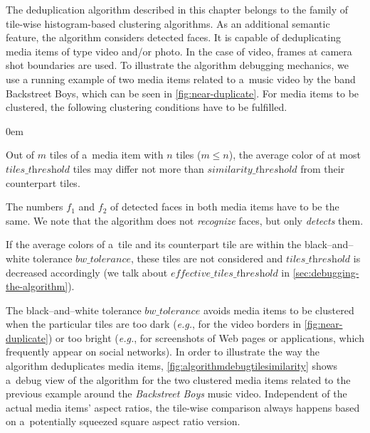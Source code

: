 The deduplication algorithm described in this chapter
belongs to the family of tile-wise histogram-based clustering algorithms.
As an additional semantic feature, the algorithm considers detected faces.
It is capable of deduplicating media items of type video and/or photo.
In the case of video, frames at camera shot boundaries are used.
To illustrate the algorithm debugging mechanics,
we use a running example of two media items related to a~music video by the 
band Backstreet Boys, which can be seen in \autoref{fig:near-duplicate}.
For media items to be clustered,
the following clustering conditions have to be fulfilled.

\begin{description}
  \itemsep0em
  \item[Cond.~1] Out of $m$ tiles of a~media item with $n$ tiles ($m \leq n$),
    the average color of at most $\textit{tiles\_threshold}$ tiles
    may differ not more than $\textit{similarity\_threshold}$
    from their counterpart tiles.
  \item[Cond.~2] The numbers $f_1$ and $f_2$ of detected faces
    in both media items have to be the same.
    We note that the algorithm does not \emph{recognize} faces,
    but only \emph{detects} them.
  \item[Cond.~3] If the average colors of a~tile and its counterpart tile
    are within the black--and--white tolerance $\textit{bw\_tolerance}$,
    these tiles are not considered and $\textit{tiles\_threshold}$
    is decreased accordingly (we talk about $\textit{effective\_tiles\_threshold}$
    in \autoref{sec:debugging-the-algorithm}).
\end{description}

The black--and--white tolerance $\textit{bw\_tolerance}$ avoids media items
to be clustered when the particular tiles are too dark (\emph{e.g.},
for the video borders in \autoref{fig:near-duplicate}) or too bright (\emph{e.g.},
for screenshots of Web pages or applications, which frequently appear on social networks).
In order to illustrate the way the algorithm deduplicates media items,
\autoref{fig:algorithmdebugtilesimilarity} shows a~debug view of the algorithm
for the two clustered media items related to the previous example
around the \emph{Backstreet Boys} music video.
Independent of the actual media items' aspect ratios,
the tile-wise comparison always happens based on
a~potentially squeezed square aspect ratio version.

